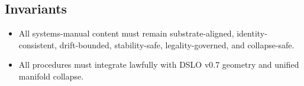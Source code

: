 \subsection{Invariants}
\begin{itemize}
    \item All systems-manual content must remain substrate-aligned, identity-consistent, drift-bounded, stability-safe, legality-governed, and collapse-safe.
    \item All procedures must integrate lawfully with DSLO v0.7 geometry and unified manifold collapse.
\end{itemize}
